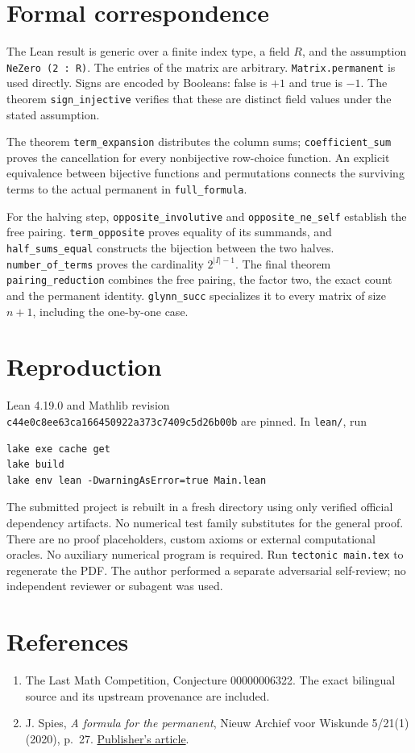 \documentclass[11pt]{article}
\begin{document}
\section*{Formal correspondence}
The Lean result is generic over a finite index type, a field $R$,
and the assumption \texttt{NeZero (2 : R)}. The entries of the
matrix are arbitrary. \texttt{Matrix.permanent} is used directly.
Signs are encoded by Booleans: false is $+1$ and true is $-1$.
The theorem \texttt{sign\_injective} verifies that these are distinct
field values under the stated assumption.

The theorem \texttt{term\_expansion} distributes the column sums;
\texttt{coefficient\_sum} proves the cancellation for every
nonbijective row-choice function. An explicit equivalence between
bijective functions and permutations connects the surviving terms
to the actual permanent in \texttt{full\_formula}.

For the halving step, \texttt{opposite\_involutive} and
\texttt{opposite\_ne\_self} establish the free pairing.
\texttt{term\_opposite} proves equality of its summands, and
\texttt{half\_sums\_equal} constructs the bijection between the two
halves. \texttt{number\_of\_terms} proves the cardinality
$2^{|I|-1}$. The final theorem \texttt{pairing\_reduction} combines
the free pairing, the factor two, the exact count and the permanent
identity. \texttt{glynn\_succ} specializes it to every matrix of
size $n+1$, including the one-by-one case.

\section*{Reproduction}
Lean 4.19.0 and Mathlib revision\\
\texttt{c44e0c8ee63ca166450922a373c7409c5d26b00b}
are pinned. In \texttt{lean/}, run
\begin{verbatim}
lake exe cache get
lake build
lake env lean -DwarningAsError=true Main.lean
\end{verbatim}
The submitted project is rebuilt in a fresh directory using only
verified official dependency artifacts. No numerical test family
substitutes for the general proof. There are no proof placeholders,
custom axioms or external computational oracles. No auxiliary
numerical program is required. Run \texttt{tectonic main.tex} to
regenerate the PDF. The author performed a separate adversarial
self-review; no independent reviewer or subagent was used.

\section*{References}
\begin{enumerate}
\item The Last Math Competition, Conjecture 00000006322. The exact
bilingual source and its upstream provenance are included.
\item J. Spies, \emph{A formula for the permanent}, Nieuw Archief
voor Wiskunde 5/21(1) (2020), p.~27.
\href{https://www.nieuwarchief.nl/serie5/pdf/naw5-2020-21-1-027.pdf}{Publisher's article}.
\end{enumerate}
\end{document}
